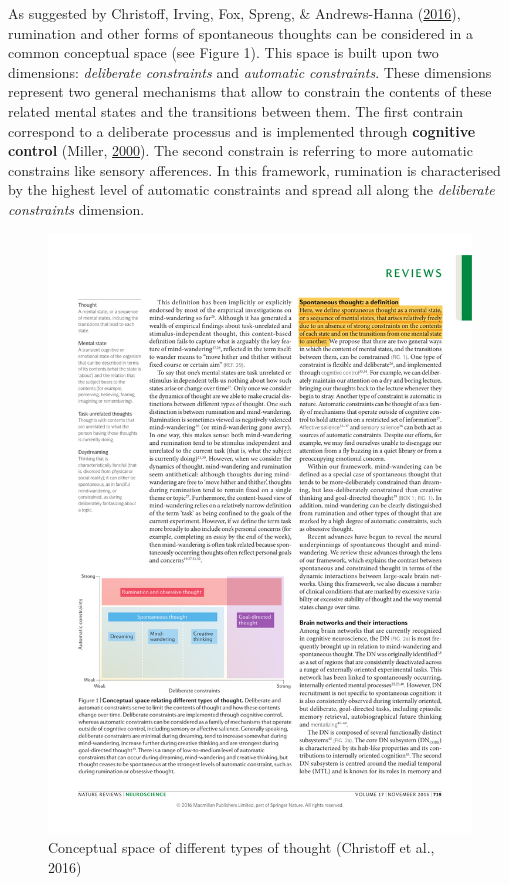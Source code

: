 \documentclass[a4paper,12pt,twoside,openright,oldfontcommands]{memoir}
\begin{document}
As suggested by Christoff, Irving, Fox, Spreng, \& Andrews-Hanna
(\protect\hyperlink{ref-christoff_mind-wandering_2016}{2016}),
rumination and other forms of spontaneous thoughts can be considered in
a common conceptual space (see Figure 1). This space is built upon two
dimensions: \emph{deliberate constraints} and \emph{automatic
constraints}. These dimensions represent two general mechanisms that
allow to constrain the contents of these related mental states and the
transitions between them. The first contrain correspond to a deliberate
processus and is implemented through \textbf{cognitive control} (Miller,
\protect\hyperlink{ref-miller_prefontral_2000}{2000}). The second
constrain is referring to more automatic constrains like sensory
afferences. In this framework, rumination is characterised by the
highest level of automatic constraints and spread all along the
\emph{deliberate constraints} dimension.

\begin{figure}[H]

{\centering \includegraphics[width=0.75\linewidth]{assets/conceptual_space} 

}

\caption{Conceptual space of different types of thought (Christoff et al., 2016)}\label{fig:conceptual}
\end{figure}
\end{document}
